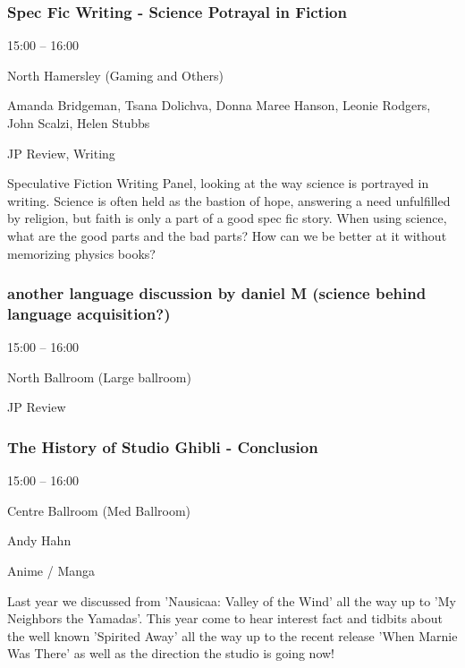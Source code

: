 \documentclass{scrreprt}
\begin{document}
\begin{multicols}{2}
\subsubsection*{Spec Fic Writing - Science Potrayal in Fiction}\begin{description}
\setlength{\itemsep}{0pt}
\setlength{\parsep}{0pt}
\setlength{\parskip}{0pt}
\item[Time:]{15:00 -- 16:00}
\item[Venue:]{North Hamersley (Gaming and Others)}
\item[People:]{Amanda Bridgeman, Tsana Dolichva, Donna Maree Hanson, Leonie Rodgers, John Scalzi, Helen Stubbs}
\item[Tags:]{JP Review, Writing}\end{description}
Speculative Fiction Writing Panel, looking at the way science is portrayed in writing. Science is often held as the bastion of hope, answering a need unfulfilled by religion, but faith is only a part of a good spec fic story. When using science, what are the good parts and the bad parts? How can we be better at it without memorizing physics books?
\subsubsection*{another language discussion by daniel M (science behind language acquisition?)}\begin{description}
\setlength{\itemsep}{0pt}
\setlength{\parsep}{0pt}
\setlength{\parskip}{0pt}
\item[Time:]{15:00 -- 16:00}
\item[Venue:]{North Ballroom (Large ballroom)}
\item[Tags:]{JP Review}\end{description}

\subsubsection*{The History of Studio Ghibli - Conclusion}\begin{description}
\setlength{\itemsep}{0pt}
\setlength{\parsep}{0pt}
\setlength{\parskip}{0pt}
\item[Time:]{15:00 -- 16:00}
\item[Venue:]{Centre Ballroom (Med Ballroom)}
\item[People:]{Andy Hahn}
\item[Tags:]{Anime / Manga}\end{description}
Last year we discussed from 'Nausicaa: Valley of the Wind' all the way up to 'My Neighbors the Yamadas'. This year come to hear interest fact and tidbits about the well known 'Spirited Away' all the way up to the recent release 'When Marnie Was There' as well as the direction the studio is going now!

\end{multicols}
\end{document}
